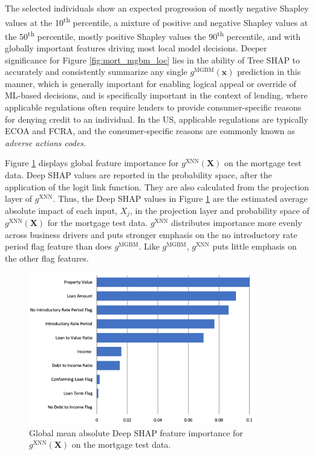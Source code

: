 \documentclass[information,article,submit,moreauthors,pdftex]{definitions/mdpi}
\begin{document}
\noindent The selected individuals show an expected progression of mostly negative Shapley values at the 10\textsuperscript{th} percentile, a mixture of positive and negative Shapley values at the 50\textsuperscript{th} percentile, mostly positive Shapley values the 90\textsuperscript{th} percentile, and with globally important features driving most local model decisions. Deeper significance for Figure \ref{fig:mort_mgbm_loc} lies in the ability of Tree SHAP to accurately and consistently summarize any single $g^\text{MGBM}(\mathbf{x})$ prediction in this manner, which is generally important for enabling logical appeal or override of ML-based decisions, and is specifically important in the context of lending, where applicable regulations often require lenders to provide consumer-specific reasons for denying credit to an individual. In the US, applicable regulations are typically ECOA and FCRA, and the consumer-specific reasons are commonly known as \textit{adverse actions codes}.

Figure \ref{fig:mort_xnn_glob} displays global feature importance for $g^\text{XNN}(\mathbf{X})$ on the mortgage test data. Deep SHAP values are reported in the probability space, after the application of the logit link function. They are also calculated from the projection layer of $g^\text{XNN}$. Thus, the Deep SHAP values in Figure \ref{fig:mort_xnn_glob} are the estimated average absolute impact of each input, $X_j$, in the projection layer and probability space of $g^\text{XNN}(\mathbf{X})$ for the mortgage test data. $g^\text{XNN}$ distributes importance more evenly across business drivers and puts stronger emphasis on the no introductory rate period flag feature than does $g^\text{MGBM}$. Like $g^\text{MGBM}$, $g^\text{XNN}$ puts little emphasis on the other flag features.  

\begin{figure}[htb]
\centering
\includegraphics[width=10cm]{img/mort_xnn_glob.png}
\caption{Global mean absolute Deep SHAP feature importance for $g^\text{XNN}(\mathbf{X})$ on the mortgage test data.}
\label{fig:mort_xnn_glob}
\end{figure} 
\end{document}
